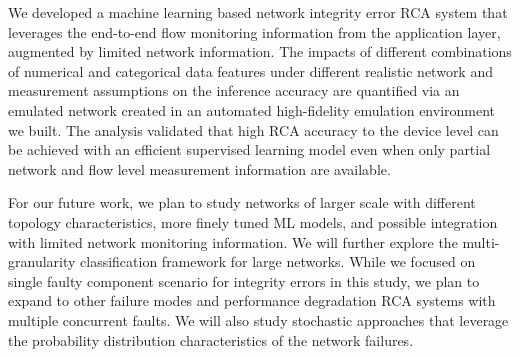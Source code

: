 We developed a machine learning based network integrity error RCA system that leverages the end-to-end flow monitoring information 
from the application layer, augmented by limited network information. The impacts of different combinations of numerical and categorical data 
features under different realistic network and measurement assumptions on the inference accuracy are quantified via an emulated network created 
in an automated high-fidelity emulation environment we built. The analysis validated that high RCA accuracy to the device level can be achieved with an efficient supervised 
learning model even when only partial network and flow level measurement information are available.

For our future work, we plan to study networks of larger scale with different topology characteristics, more finely tuned ML models, and possible integration with limited network monitoring information. We will further explore the multi-granularity classification framework for large networks. While we focused on single faulty component scenario for integrity errors in this study, we plan to expand to other failure modes and performance degradation RCA systems with multiple concurrent faults. We will also study stochastic approaches that leverage the probability distribution characteristics of the network failures.  
